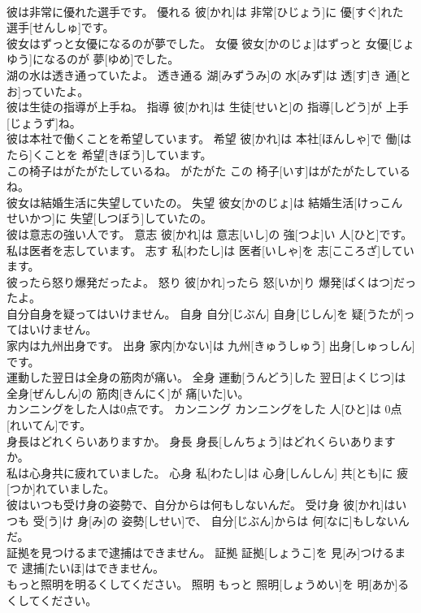 \documentclass[8pt]{extreport}
\begin{document}
\begin{CJK}{UTF8}{min}
\\	彼は非常に優れた選手です。	優れる	彼[かれ]は 非常[ひじょう]に 優[すぐ]れた 選手[せんしゅ]です。	
\\	彼女はずっと女優になるのが夢でした。	女優	彼女[かのじょ]はずっと 女優[じょゆう]になるのが 夢[ゆめ]でした。	
\\	湖の水は透き通っていたよ。	透き通る	湖[みずうみ]の 水[みず]は 透[す]き 通[とお]っていたよ。	
\\	彼は生徒の指導が上手ね。	指導	彼[かれ]は 生徒[せいと]の 指導[しどう]が 上手[じょうず]ね。	
\\	彼は本社で働くことを希望しています。	希望	彼[かれ]は 本社[ほんしゃ]で 働[はたら]くことを 希望[きぼう]しています。	
\\	この椅子はがたがたしているね。	がたがた	この 椅子[いす]はがたがたしているね。	
\\	彼女は結婚生活に失望していたの。	失望	彼女[かのじょ]は 結婚生活[けっこん せいかつ]に 失望[しつぼう]していたの。	
\\	彼は意志の強い人です。	意志	彼[かれ]は 意志[いし]の 強[つよ]い 人[ひと]です。	
\\	私は医者を志しています。	志す	私[わたし]は 医者[いしゃ]を 志[こころざ]しています。	
\\	彼ったら怒り爆発だったよ。	怒り	彼[かれ]ったら 怒[いか]り 爆発[ばくはつ]だったよ。	
\\	自分自身を疑ってはいけません。	自身	自分[じぶん] 自身[じしん]を 疑[うたが]ってはいけません。	
\\	家内は九州出身です。	出身	家内[かない]は 九州[きゅうしゅう] 出身[しゅっしん]です。	
\\	運動した翌日は全身の筋肉が痛い。	全身	運動[うんどう]した 翌日[よくじつ]は 全身[ぜんしん]の 筋肉[きんにく]が 痛[いた]い。	
\\	カンニングをした人は0点です。	カンニング	カンニングをした 人[ひと]は 0点[れいてん]です。	
\\	身長はどれくらいありますか。	身長	身長[しんちょう]はどれくらいありますか。	
\\	私は心身共に疲れていました。	心身	私[わたし]は 心身[しんしん] 共[とも]に 疲[つか]れていました。	
\\	彼はいつも受け身の姿勢で、自分からは何もしないんだ。	受け身	彼[かれ]はいつも 受[う]け 身[み]の 姿勢[しせい]で、 自分[じぶん]からは 何[なに]もしないんだ。	
\\	証拠を見つけるまで逮捕はできません。	証拠	証拠[しょうこ]を 見[み]つけるまで 逮捕[たいほ]はできません。	
\\	もっと照明を明るくしてください。	照明	もっと 照明[しょうめい]を 明[あか]るくしてください。	

\end{CJK}
\end{document}
